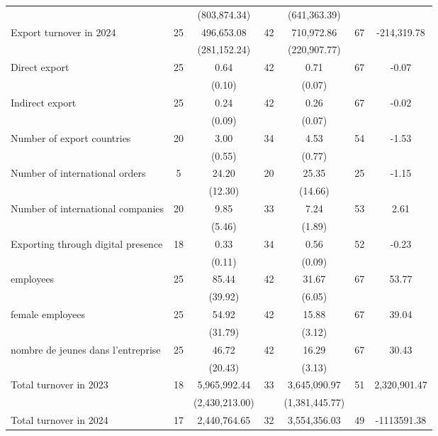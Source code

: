 \begin{tabular}{@{\extracolsep{5pt}}lcccccc}
 &   & (803,874.34)  &   & (641,363.39)  &   &  \\ [1ex]
Export turnover in 2024   & 25    & 496,653.08    & 42    & 710,972.86    & 67    & -214,319.78   \\
 &   & (281,152.24)  &   & (220,907.77)  &   &  \\ [1ex]
Direct export   & 25    & 0.64    & 42    & 0.71    & 67    & -0.07   \\
 &   & (0.10)  &   & (0.07)  &   &  \\ [1ex]
Indirect export   & 25    & 0.24    & 42    & 0.26    & 67    & -0.02   \\
 &   & (0.09)  &   & (0.07)  &   &  \\ [1ex]
Number of export countries   & 20    & 3.00    & 34    & 4.53    & 54    & -1.53   \\
 &   & (0.55)  &   & (0.77)  &   &  \\ [1ex]
Number of international orders   & 5    & 24.20    & 20    & 25.35    & 25    & -1.15   \\
 &   & (12.30)  &   & (14.66)  &   &  \\ [1ex]
Number of international companies   & 20    & 9.85    & 33    & 7.24    & 53    & 2.61   \\
 &   & (5.46)  &   & (1.89)  &   &  \\ [1ex]
Exporting through digital presence   & 18    & 0.33    & 34    & 0.56    & 52    & -0.23   \\
 &   & (0.11)  &   & (0.09)  &   &  \\ [1ex]
employees   & 25    & 85.44    & 42    & 31.67    & 67    & 53.77   \\
 &   & (39.92)  &   & (6.05)  &   &  \\ [1ex]
female employees   & 25    & 54.92    & 42    & 15.88    & 67    & 39.04   \\
 &   & (31.79)  &   & (3.12)  &   &  \\ [1ex]
nombre de jeunes dans l'entreprise   & 25    & 46.72    & 42    & 16.29    & 67    & 30.43   \\
 &   & (20.43)  &   & (3.13)  &   &  \\ [1ex]
Total turnover in 2023   & 18    & 5,965,992.44    & 33    & 3,645,090.97    & 51    & 2,320,901.47   \\
 &   & (2,430,213.00)  &   & (1,381,445.77)  &   &  \\ [1ex]
Total turnover in 2024   & 17    & 2,440,764.65    & 32    & 3,554,356.03    & 49    & -1113591.38   \\

\end{tabular}
